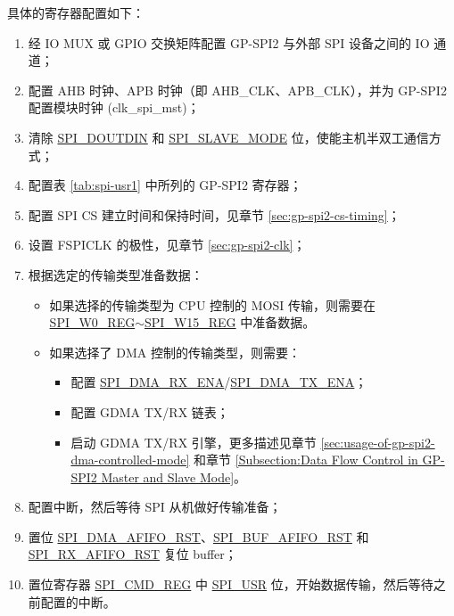 \documentclass[main\_\_CN.tex]{subfiles}
\begin{document}
具体的寄存器配置如下：
\begin{enumerate}
    \item 经 IO MUX 或 GPIO 交换矩阵配置 GP-SPI2 与外部 SPI 设备之间的 IO 通道；
    \item 配置 AHB 时钟、APB 时钟（即 AHB\_CLK、APB\_CLK），并为 GP-SPI2 配置模块时钟 (clk\_spi\_mst)；

    \item 清除 \hyperref[fielddesc:SPIDOUTDIN]{SPI\_DOUTDIN} 和 \hyperref[fielddesc:SPISLAVEMODE]{SPI\_SLAVE\_MODE} 位，使能主机半双工通信方式；

    \item 配置表 \ref{tab:spi-usr1} 中所列的 GP-SPI2 寄存器；

    \item 配置 SPI CS 建立时间和保持时间，见章节  \ref{sec:gp-spi2-cs-timing}；

    \item 设置 FSPICLK 的极性，见章节  \ref{sec:gp-spi2-clk}；

    \item 根据选定的传输类型准备数据：
    \begin{itemize}
        \item 如果选择的传输类型为 CPU 控制的 MOSI 传输，则需要在 \hyperref[regdesc:SPIW0REG]{SPI\_W0\_REG}$\sim$\hyperref[regdesc:SPIW15REG]{SPI\_W15\_REG} 中准备数据。

        \item 如果选择了 DMA 控制的传输类型，则需要：
        \begin{itemize}
            \item 配置 \hyperref[fielddesc:SPIDMARXENA]{SPI\_DMA\_RX\_ENA}/\hyperref[fielddesc:SPIDMATXENA]{SPI\_DMA\_TX\_ENA}；
            \item 配置 GDMA TX/RX 链表；
            \item 启动 GDMA TX/RX 引擎，更多描述见章节  \ref{sec:usage-of-gp-spi2-dma-controlled-mode} 和章节  \ref{Subsection:Data Flow Control in GP-SPI2 Master and Slave Mode}。
        \end{itemize}
    \end{itemize}

    \item 配置中断，然后等待 SPI 从机做好传输准备；

    \item 置位 \hyperref[fielddesc:SPIDMAAFIFORST]{SPI\_DMA\_AFIFO\_RST}、\hyperref[fielddesc:SPIBUFAFIFORST]{SPI\_BUF\_AFIFO\_RST} 和 \hyperref[fielddesc:SPIRXAFIFORST]{SPI\_RX\_AFIFO\_RST} 复位 buffer；

    \item 置位寄存器 \hyperref[regdesc:SPICMDREG]{SPI\_CMD\_REG} 中 \hyperref[fielddesc:SPIUSR]{SPI\_USR} 位，开始数据传输，然后等待之前配置的中断。
\end{enumerate}
\end{document}
